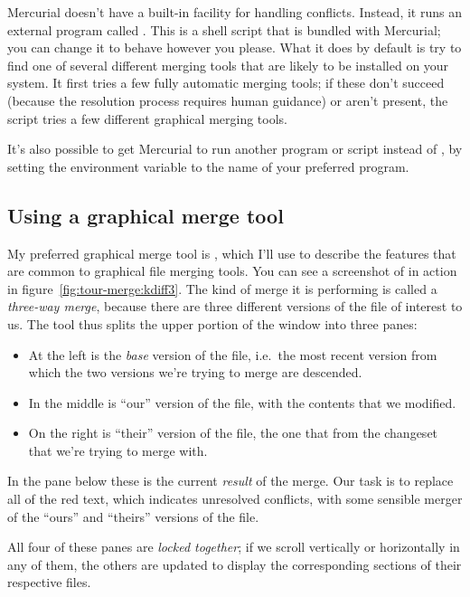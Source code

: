 Mercurial doesn't have a built-in facility for handling conflicts.
Instead, it runs an external program called .  This
is a shell script that is bundled with Mercurial; you can change it to
behave however you please.  What it does by default is try to find one
of several different merging tools that are likely to be installed on
your system.  It first tries a few fully automatic merging tools; if
these don't succeed (because the resolution process requires human
guidance) or aren't present, the script tries a few different
graphical merging tools.

It's also possible to get Mercurial to run another program or script
instead of , by setting the 
environment variable to the name of your preferred program.

\subsection{Using a graphical merge tool}

My preferred graphical merge tool is , which I'll use
to describe the features that are common to graphical file merging
tools.  You can see a screenshot of  in action in
figure~\ref{fig:tour-merge:kdiff3}.  The kind of merge it is
performing is called a \emph{three-way merge}, because there are three
different versions of the file of interest to us.  The tool thus
splits the upper portion of the window into three panes:
\begin{itemize}
\item At the left is the \emph{base} version of the file, i.e.~the
  most recent version from which the two versions we're trying to
  merge are descended.
\item In the middle is ``our'' version of the file, with the contents
  that we modified.
\item On the right is ``their'' version of the file, the one that
  from the changeset that we're trying to merge with.
\end{itemize}
In the pane below these is the current \emph{result} of the merge.
Our task is to replace all of the red text, which indicates unresolved
conflicts, with some sensible merger of the ``ours'' and ``theirs''
versions of the file.

All four of these panes are \emph{locked together}; if we scroll
vertically or horizontally in any of them, the others are updated to
display the corresponding sections of their respective files.

